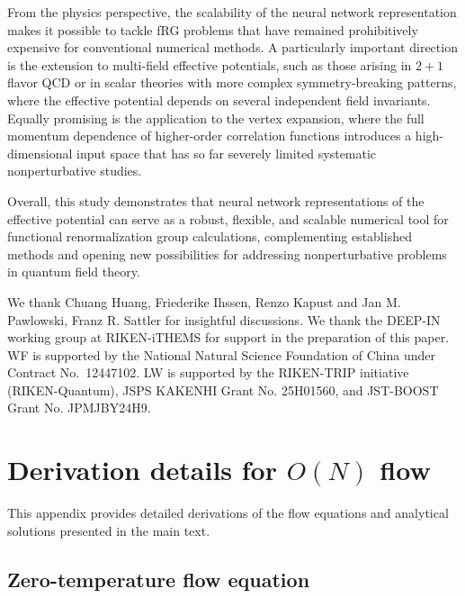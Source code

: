 \documentclass[reprint,twocolumn,superscriptaddress,preprintnumbers,amsmath,amssymb,aps,prd,floatfix]{revtex4-2}
\begin{document}
From the physics perspective, the scalability of the neural network representation makes it possible to tackle fRG problems that have remained prohibitively expensive for conventional numerical methods. A particularly important direction is the extension to multi-field effective potentials, such as those arising in $2+1$ flavor QCD or in scalar theories with more complex symmetry-breaking patterns, where the effective potential depends on several independent field invariants. Equally promising is the application to the vertex expansion, where the full momentum dependence of higher-order correlation functions introduces a high-dimensional input space that has so far severely limited systematic nonperturbative studies.

Overall, this study demonstrates that neural network representations of the effective potential can serve as a robust, flexible, and scalable numerical tool for functional renormalization group calculations, complementing established methods and opening new possibilities for addressing nonperturbative problems in quantum field theory.

\begin{acknowledgments}
We thank Chuang Huang, Friederike Ihssen, Renzo Kapust and Jan M. Pawlowski, Franz R. Sattler for insightful discussions.
We thank the DEEP-IN working group at RIKEN-iTHEMS for support in the preparation of this paper.
WF is supported by the National Natural Science Foundation of China under Contract No.\ 12447102.
LW is supported by the RIKEN-TRIP initiative (RIKEN-Quantum), JSPS KAKENHI Grant No. 25H01560, and JST-BOOST Grant No. JPMJBY24H9.

\end{acknowledgments}

\appendix
\section{Derivation details for $O(N)$ flow}
\label{app:derivations}

This appendix provides detailed derivations of the flow equations and analytical solutions presented in the main text.

\subsection{Zero-temperature flow equation}
\label{app:zeroT}
\end{document}
